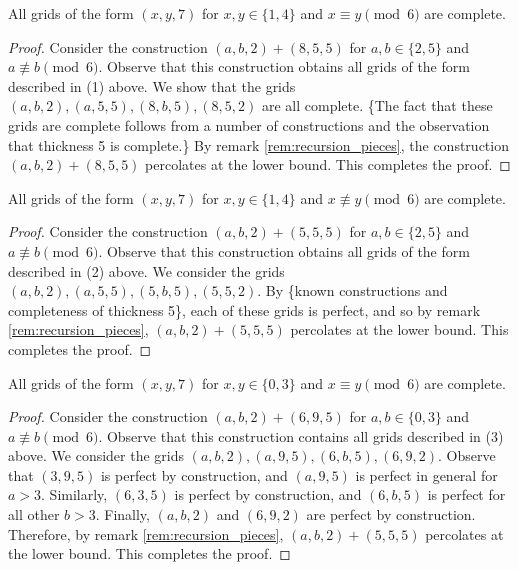 \begin{lem}
\label{lem:thickness_7_case_1}
All grids of the form $(x,y,7)$ for $x,y \in \{1,4\}$ and $x \equiv y \pmod 6$ are complete.
\end{lem}

\begin{proof}
Consider the construction $(a,b,2) + (8,5,5)$ for $a,b \in \{2,5\}$ and $a \not\equiv b \pmod 6$. Observe that this construction obtains all grids of the form described in (1) above. We show that the grids $(a,b,2), (a,5,5), (8,b,5), (8,5,2)$ are all complete. 
\{The fact that these grids are complete follows from a number of constructions and the observation that thickness 5 is complete.\} 
By remark \ref{rem:recursion_pieces}, the construction $(a,b,2) + (8,5,5)$ percolates at the lower bound. This completes the proof. 
\end{proof}

\begin{lem}
\label{lem:thickness_7_case_2}
All grids of the form $(x,y,7)$ for $x,y \in \{1,4\}$ and $x \not\equiv y \pmod 6$ are complete.
\end{lem}

\begin{proof}
Consider the construction $(a,b,2) + (5,5,5)$ for $a,b \in \{2,5\}$ and $a \not\equiv b \pmod 6$. Observe that this construction obtains all grids of the form described in (2) above. We consider the grids $(a,b,2), (a,5,5), (5,b,5), (5,5,2)$. By \{known constructions and completeness of thickness 5\}, each of these grids is perfect, and so by remark \ref{rem:recursion_pieces}, $(a,b,2) + (5,5,5)$ percolates at the lower bound. This completes the proof.
\end{proof}

\begin{lem}
\label{lem:thickness_7_case_3}
All grids of the form $(x,y,7)$ for $x,y \in \{0,3\}$ and $x \equiv y \pmod 6$ are complete.
\end{lem}

\begin{proof}
Consider the construction $(a,b,2) + (6,9,5)$ for $a,b \in \{0,3\}$ and $a \not\equiv b \pmod 6$. Observe that this construction contains all grids described in (3) above. We consider the grids $(a,b,2), (a,9,5), (6,b,5), (6,9,2)$. Observe that $(3,9,5)$ is perfect by construction, and $(a,9,5)$ is perfect in general for $a>3$. Similarly, $(6,3,5)$ is perfect by construction, and $(6,b,5)$ is perfect for all other $b>3$. Finally, $(a,b,2)$ and $(6,9,2)$ are perfect by construction. Therefore, by remark \ref{rem:recursion_pieces}, $(a,b,2) + (5,5,5)$ percolates at the lower bound. This completes the proof.
\end{proof}

